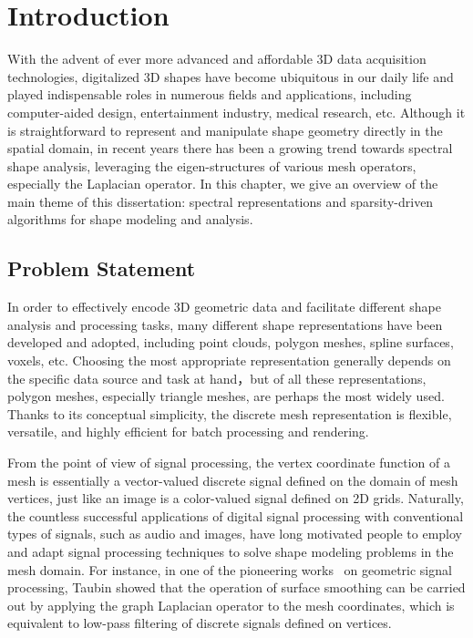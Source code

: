 \chapter{Introduction}
\label{chap:introduction}

With the advent of ever more advanced and affordable 3D data acquisition
technologies, digitalized 3D shapes have become ubiquitous in our daily
life and played indispensable roles in numerous fields and applications,
including computer-aided design, entertainment industry, medical research, etc.
Although it is straightforward to represent and manipulate shape geometry
directly in the spatial domain, in recent years there has been a growing trend
towards spectral shape analysis, leveraging the eigen-structures of various mesh
operators, especially the Laplacian operator. In this chapter, we give an overview of
the main theme of this dissertation: spectral representations and sparsity-driven
algorithms for shape modeling and analysis.

\section{Problem Statement}
In order to effectively encode 3D geometric data and facilitate different
shape analysis and processing tasks, many different shape representations have
been developed and adopted, including point clouds, polygon meshes, spline surfaces,
voxels, etc. Choosing the most appropriate representation generally depends on the
specific data source and task at hand，but of all these representations,
polygon meshes, especially triangle meshes, are perhaps the most widely used.
Thanks to its conceptual simplicity, the discrete mesh representation is flexible, versatile,
and highly efficient for batch processing and rendering.

From the point of view of signal processing, the vertex coordinate function of
a mesh is essentially a vector-valued discrete signal defined on the domain of
mesh vertices, just like an image is a color-valued signal defined on 2D grids.
Naturally, the countless successful applications of digital signal processing with conventional
types of signals, such as audio and images, have long motivated people to employ 
and adapt signal processing techniques to solve shape modeling problems in the 
mesh domain. For instance, in one of the pioneering works~\cite{Taubin1995} on 
geometric signal processing, Taubin showed that the operation of surface smoothing 
can be carried out by applying the graph Laplacian operator to the mesh coordinates, 
which is equivalent to low-pass filtering of discrete signals defined on vertices.

